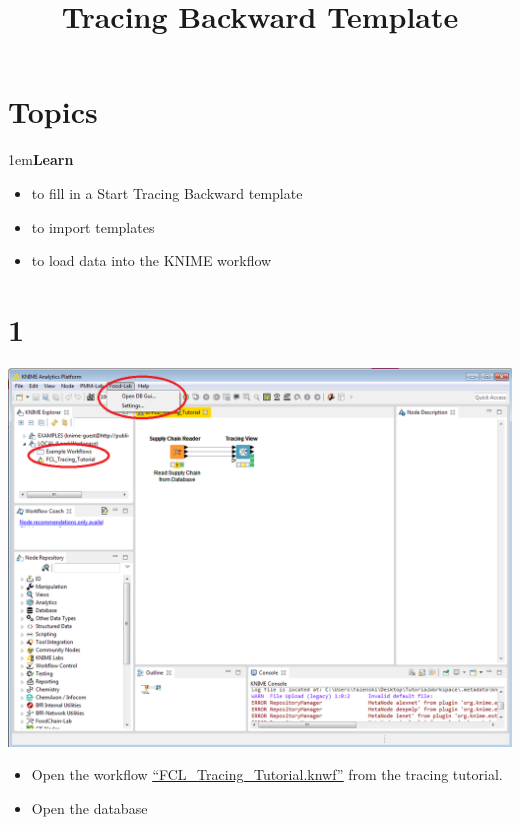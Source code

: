 \documentclass[10pt]{beamer}
\title{Tracing Backward Template}
\date{}
\begin{document}
\maketitle

\section{Topics}
\begin{frame}
\leftskip1em\textbf{Learn}
	\begin{itemize}
		\item to fill in a Start Tracing Backward template
    \item to import templates
    \item to load data into the KNIME workflow
	\end{itemize}
\end{frame}

\section{1}
\begin{frame}
	\begin{center}
		\includegraphics[height=0.6\textheight]{1.png}
	\end{center}
	\begin{itemize}
		\item Open the workflow \textcolor{blue}{\underline{\href{https://github.com/SiLeBAT/BfROpenLabResources/raw/master/GitHubPages/workflows/FCL\_Tracing_Tutorial.knwf}{``FCL\_Tracing\_Tutorial.knwf''}}} from the tracing tutorial.
    \item Open the database
	\end{itemize}
\end{frame}
\end{document}

